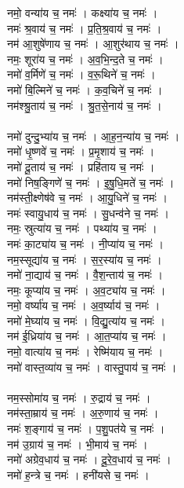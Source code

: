 नमो॒ वन्या॑य च॒ नमः॑ । कक्ष्या॑य च॒ नमः॑ ।\\
नमः॑ श्र॒वाय॑ च॒ नमः॑ । प्र॒ति॒श्र॒वाय॑ च॒ नमः॑ ।\\
नम॑ आ॒शुषे॑णाय च॒ नमः॑ । आ॒शुर॑थाय च॒ नमः॑ ।\\
नमः॒ शूरा॑य च॒ नमः॑ । अ॒व॒भि॒न्द॒ते च॒ नमः॑ ।\\
नमो॑ व॒र्मिणे॑ च॒ नमः॑ । व॒रू॒थिने॑ च॒ नमः॑ ।\\
नमो॑ बि॒ल्मिने॑ च॒ नमः॑ । क॒व॒चिने॑ च॒ नमः॑ ।\\
नम॑श्श्रु॒ताय॑ च॒ नमः॑ । श्रु॒त॒से॒नाय॑ च॒ नमः॑ ।\\
\\
नमो॑ दुन्दु॒भ्या॑य च॒ नमः॑ । आ॒ह॒न॒न्या॑य च॒ नमः॑ ।\\
नमो॑ धृ॒ष्णवे॑ च॒ नमः॑ । प्र॒मृ॒शाय॑ च॒ नमः॑ ।\\
नमो॑ दू॒ताय॑ च॒ नमः॑ । प्रहि॑ताय च॒ नमः॑ ।\\
नमो॑ निष॒ङ्गिणे॑ च॒ नमः॑ । इ॒षु॒धि॒मते॑ च॒ नमः॑ ।\\
नम॑स्ती॒क्ष्णेष॑वे च॒ नमः॑ । आ॒यु॒धिने॑ च॒ नमः॑ ।\\
नमः॑ स्वायु॒धाय॑ च॒ नमः॑ । सु॒धन्व॑ने च॒ नमः॑ ।\\
नमः॒ स्रुत्या॑य च॒ नमः॑ । पथ्या॑य च॒ नमः॑ ।\\
नमः॑ का॒ट्या॑य च॒ नमः॑ । नी॒प्या॑य च॒ नमः॑ ।\\
नम॒स्सूद्या॑य च॒ नमः॑ । स॒र॒स्या॑य च॒ नमः॑ ।\\
नमो॑ ना॒द्याय॑ च॒ नमः॑ । वै॒श॒न्ताय॑ च॒ नमः॑ ।\\
नमः॒ कूप्या॑य च॒ नमः॑ । अ॒व॒ट्या॑य च॒ नमः॑ ।\\
नमो॒ वर्ष्या॑य च॒ नमः॑ । अ॒व॒र्ष्याय॑ च॒ नमः॑ ।\\
नमो॑ मे॒घ्या॑य च॒ नमः॑ । वि॒द्यु॒त्या॑य च॒ नमः॑ ।\\
नम॑ ई॒ध्रिया॑य च॒ नमः॑ । आ॒त॒प्या॑य च॒ नमः॑ ।\\
नमो॒ वात्या॑य च॒ नमः॑ । रेष्मि॑याय च॒ नमः॑ ।\\
नमो॑ वास्त॒व्या॑य च॒ नमः॑ । वास्तु॒पाय॑ च॒ नमः॑ ।\\
\\
नम॒स्सोमा॑य च॒ नमः॑ । रु॒द्राय॑ च॒ नमः॑ ।\\
नम॑स्ता॒म्राय॑ च॒ नमः॑ । अ॒रु॒णाय॑ च॒ नमः॑ ।\\
नमः॑ श॒ङ्गाय॑ च॒ नमः॑ । प॒शु॒पत॑ये च॒ नमः॑ ।\\
नम॑ उ॒ग्राय॑ च॒ नमः॑ । भी॒माय॑ च॒ नमः॑ ।\\
नमो॑ अग्रेव॒धाय॑ च॒ नमः॑ । दू॒रे॒व॒धाय॑ च॒ नमः॑ ।\\
नमो॑ ह॒न्त्रे च॒ नमः॑ । हनी॑यसे च॒ नमः॑ ।\\
